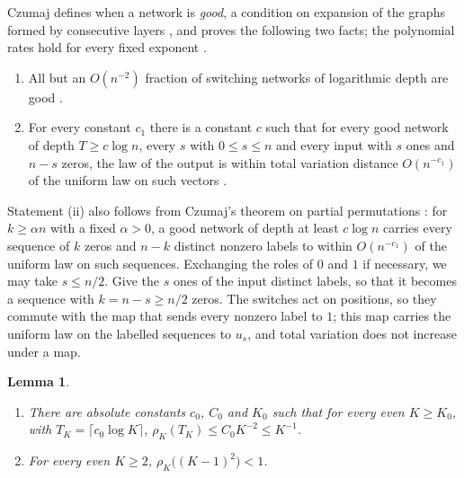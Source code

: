\documentclass[11pt]{amsart}
\newtheorem{lemma}[theorem]{Lemma}
\theoremstyle{remark}
\numberwithin{equation}{section}
\begin{document}
Czumaj defines when a network is \emph{good}, a condition on expansion of the graphs formed by consecutive layers \cite[Section~2.2]{Cz15}, and proves the following two facts; the polynomial rates hold for every fixed exponent \cite[footnotes 2 and 3]{Cz15}.
\begin{enumerate}[label=(\roman*)]
\item All but an $O(n^{-2})$ fraction of switching networks of logarithmic depth are good \cite[Proposition~2.3]{Cz15}.
\item For every constant $c_1$ there is a constant $c$ such that for every good network of depth $T\ge c\log n$, every $s$ with $0\le s\le n$ and every input with $s$ ones and $n-s$ zeros, the law of the output is within total variation distance $O(n^{-c_1})$ of the uniform law on such vectors \cite[Theorem~3.7]{Cz15}.
\end{enumerate}
Statement (ii) also follows from Czumaj's theorem on partial permutations \cite[Theorem~3.4]{Cz15}: for $k\ge\alpha n$ with a fixed $\alpha>0$, a good network of depth at least $c\log n$ carries every sequence of $k$ zeros and $n-k$ distinct nonzero labels to within $O(n^{-c_1})$ of the uniform law on such sequences. Exchanging the roles of $0$ and $1$ if necessary, we may take $s\le n/2$. Give the $s$ ones of the input distinct labels, so that it becomes a sequence with $k=n-s\ge n/2$ zeros. The switches act on positions, so they commute with the map that sends every nonzero label to $1$; this map carries the uniform law on the labelled sequences to $u_s$, and total variation does not increase under a map.

\begin{lemma}\label{lem:rho}
\leavevmode
\begin{enumerate}[label=\textup{(\alph*)}]
\item There are absolute constants $c_0$, $C_0$ and $K_0$ such that for every even $K\ge K_0$, with $T_K=\lceil c_0\log K\rceil$, $\rho_K(T_K)\le C_0K^{-2}\le K^{-1}$.
\item For every even $K\ge2$, $\rho_K\bigl((K-1)^2\bigr)<1$.
\end{enumerate}
\end{lemma}
\end{document}
